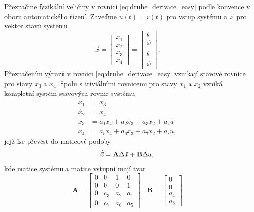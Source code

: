 \documentclass[conference]{IEEEtran}
\begin{document}
Přeznačme fyzikální veličiny v rovnici \eqref{eq:druhe_derivace_easy} podle konvence v oboru automatického řízení.
Zaveďme $u(t) = v(t)$ pro vstup systému a $\vec{x}$ pro vektor stavů systému
\begin{equation}
    \vec{x} = \begin{bmatrix}
        x_1 \\
        x_2 \\
        x_3 \\
        x_4
    \end{bmatrix} = \begin{bmatrix}
        \theta \\
        \psi \\
        \dot{\theta} \\
        \dot{\psi}
    \end{bmatrix}.
\end{equation}
Přeznačením výrazů v rovnici \eqref{eq:druhe_derivace_easy} vznikají stavové rovnice pro stavy $x_3$ a $x_4$. 
Spolu s triviálními rovnicemi pro stavy $x_1$ a $x_2$ vzniká kompletní systém stavových rovnic systému
\begin{equation}
    \begin{split}
        \dot{x_1} &= x_3 \\
        \dot{x_2} &= x_4 \\
        \dot{x_3} & = a_1 x_4 + a_2 x_3 + a_3 x_2 + a_4 u \\
        \dot{x_4} &= a_5  x_4 + a_6 x_3 + a_7 x_2 + a_8 u,
        \label{eq:stavove_rovnice}
    \end{split}
\end{equation}
jejž lze převést do maticové podoby
\begin{equation}
    \dot{\vec{x}} = \mathbf{A} \Delta \vec{x} + \mathbf{B} \Delta u, \\
\end{equation}
kde matice systému a matice vstupní mají tvar
\begin{equation}
    \mathbf{A} = \begin{bmatrix}
        0 & 0 & 1 & 0 \\
        0 & 0 & 0 & 1 \\
        0 & a_3 & a_2 & a_1 \\
        0 & a_7 & a_6 & a_5
    \end{bmatrix} ~~~~ \mathbf{B} = \begin{bmatrix}
        0 \\ 0 \\a_4 \\a_8
    \end{bmatrix}
\end{equation}
\end{document}
